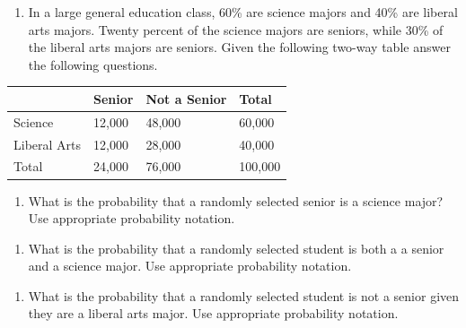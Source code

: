 \documentclass[
]{report}
\providecommand{\tightlist}{%
  \setlength{\itemsep}{0pt}\setlength{\parskip}{0pt}}
\begin{document}
\begin{enumerate}
\def\labelenumi{\arabic{enumi}.}
\tightlist
\item
  In a large general education class, 60\% are science majors and 40\% are liberal arts majors. Twenty percent of the science majors are seniors, while 30\% of the liberal arts majors are seniors. Given the following two-way table answer the following questions.
\end{enumerate}

\begin{longtable}[]{@{}llll@{}}
\toprule
& Senior & Not a Senior & Total \\
\midrule
\endhead
Science & 12,000 & 48,000 & 60,000 \\
Liberal Arts & 12,000 & 28,000 & 40,000 \\
Total & 24,000 & 76,000 & 100,000 \\
\bottomrule
\end{longtable}

\begin{enumerate}
\def\labelenumi{\alph{enumi}.}
\tightlist
\item
  What is the probability that a randomly selected senior is a science major? Use appropriate probability notation.
\end{enumerate}

\vspace{0.5in}

\begin{enumerate}
\def\labelenumi{\alph{enumi}.}
\setcounter{enumi}{1}
\tightlist
\item
  What is the probability that a randomly selected student is both a a senior and a science major. Use appropriate probability notation.
\end{enumerate}

\vspace{0.5in}

\begin{enumerate}
\def\labelenumi{\alph{enumi}.}
\setcounter{enumi}{2}
\tightlist
\item
  What is the probability that a randomly selected student is not a senior given they are a liberal arts major. Use appropriate probability notation.
\end{enumerate}

\vspace{0.5in}
\end{document}
